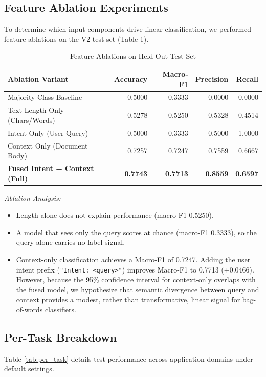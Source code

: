 \documentclass[10pt,conference]{IEEEtran}
\begin{document}
\subsection{Feature Ablation Experiments}
To determine which input components drive linear classification, we performed feature ablations on the V2 test set (Table \ref{tab:ablations}).

\begin{table}[h]
\centering
\caption{Feature Ablations on Held-Out Test Set}
\label{tab:ablations}
\begin{tabular}{lrrrr}
\toprule
\textbf{Ablation Variant} & \textbf{Accuracy} & \textbf{Macro-F1} & \textbf{Precision} & \textbf{Recall} \\
\midrule
Majority Class Baseline & 0.5000 & 0.3333 & 0.0000 & 0.0000 \\
Text Length Only (Chars/Words) & 0.5278 & 0.5250 & 0.5328 & 0.4514 \\
Intent Only (User Query) & 0.5000 & 0.3333 & 0.5000 & 1.0000 \\
Context Only (Document Body) & 0.7257 & 0.7247 & 0.7559 & 0.6667 \\
\midrule
\textbf{Fused Intent + Context (Full)} & \textbf{0.7743} & \textbf{0.7713} & \textbf{0.8559} & \textbf{0.6597} \\
\bottomrule
\end{tabular}
\end{table}

\noindent\textit{Ablation Analysis:}
\begin{itemize}
    \item Length alone does not explain performance (macro-F1 0.5250).
    \item A model that sees only the query scores at chance (macro-F1 0.3333), so the query alone carries no label signal.
    \item Context-only classification achieves a Macro-F1 of 0.7247. Adding the user intent prefix (\texttt{"Intent: <query>"}) improves Macro-F1 to 0.7713 (+0.0466). However, because the 95\% confidence interval for context-only overlaps with the fused model, we hypothesize that semantic divergence between query and context provides a modest, rather than transformative, linear signal for bag-of-words classifiers.
\end{itemize}

\subsection{Per-Task Breakdown}
Table \ref{tab:per_task} details test performance across application domains under default settings.
\end{document}
